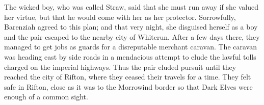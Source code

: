 The wicked boy, who was called Straw, said that she must run away if she valued her virtue, but that he would come with her as her protector. Sorrowfully, Barenziah agreed to this plan; and that very night, she disguised herself as a boy and the pair escaped to the nearby city of Whiterun. After a few days there, they managed to get jobs as guards for a disreputable merchant caravan. The caravan was heading east by side roads in a mendacious attempt to elude the lawful tolls charged on the imperial highways. Thus the pair eluded pursuit until they reached the city of Rifton, where they ceased their travels for a time. They felt safe in Rifton, close as it was to the Morrowind border so that Dark Elves were enough of a common sight.